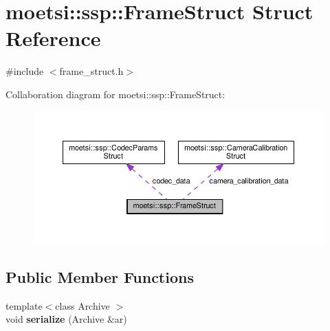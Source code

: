 \hypertarget{structmoetsi_1_1ssp_1_1FrameStruct}{}\section{moetsi\+:\+:ssp\+:\+:Frame\+Struct Struct Reference}
\label{structmoetsi_1_1ssp_1_1FrameStruct}


{\ttfamily \#include $<$frame\+\_\+struct.\+h$>$}



Collaboration diagram for moetsi\+:\+:ssp\+:\+:Frame\+Struct\+:
\nopagebreak
\begin{figure}[H]
\begin{center}
\leavevmode
\includegraphics[width=350pt]{structmoetsi_1_1ssp_1_1FrameStruct__coll__graph}
\end{center}
\end{figure}
\subsection*{Public Member Functions}
\begin{DoxyCompactItemize}
\item 
\mbox{\label{structmoetsi_1_1ssp_1_1FrameStruct_af53f4e76978e2a4575b7cd661d30e01f}} 
{\footnotesize template$<$class Archive $>$ }\\void {\bfseries serialize} (Archive \&ar)
\end{DoxyCompactItemize}
